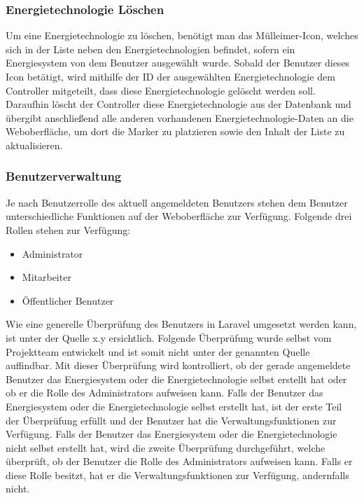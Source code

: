 \newpage
\subsubsection{Energietechnologie Löschen}
Um eine Energietechnologie zu löschen, benötigt man das Mülleimer-Icon, welches sich in der Liste neben den Energietechnologien befindet, sofern ein Energiesystem von dem Benutzer ausgewählt wurde.
Sobald der Benutzer dieses Icon betätigt, wird mithilfe der ID der ausgewählten Energietechnologie dem Controller mitgeteilt, dass diese Energietechnologie gelöscht werden soll. Daraufhin löscht der Controller diese Energietechnologie aus der Datenbank und übergibt anschließend alle anderen vorhandenen Energietechnologie-Daten an die Weboberfläche, um dort die Marker zu platzieren sowie den Inhalt der Liste zu aktualisieren.


\subsubsection{Benutzerverwaltung}
Je nach Benutzerrolle des aktuell angemeldeten Benutzers stehen dem Benutzer unterschiedliche Funktionen auf der Weboberfläche zur Verfügung.  
Folgende drei Rollen stehen zur Verfügung:
\begin{itemize}
	\item Administrator 
	\item Mitarbeiter
	\item Öffentlicher Benutzer
\end{itemize}
Wie eine generelle Überprüfung des Benutzers in Laravel umgesetzt werden kann, ist unter der Quelle x.y ersichtlich. 
\newline Folgende Überprüfung wurde selbst vom Projektteam entwickelt und ist somit nicht unter der genannten Quelle auffindbar.\newline \newline
Mit dieser Überprüfung wird kontrolliert, ob der gerade angemeldete Benutzer das Energiesystem oder die Energietechnologie selbst erstellt hat oder ob er die Rolle des Administrators aufweisen kann. Falls der Benutzer das Energiesystem oder die Energietechnologie selbst erstellt hat, ist der erste Teil der Überprüfung erfüllt und der Benutzer hat die Verwaltungsfunktionen zur Verfügung. Falls der Benutzer das Energiesystem oder die Energietechnologie nicht selbst erstellt hat, wird die zweite Überprüfung durchgeführt, welche überprüft, ob der Benutzer die Rolle des Administrators aufweisen kann. Falls er diese Rolle besitzt, hat er die Verwaltungsfunktionen zur Verfügung, andernfalls nicht.


